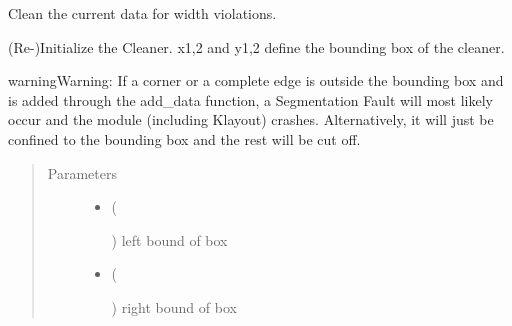 \documentclass[a4paper,10pt,english]{sphinxmanual}
\begin{document}
\begin{fulllineitems}
\begin{fulllineitems}
\label{\detokenize{drc/drc:kppc.drc.kppc.drc.slcleaner.PyDrcSl.clean_width}}
Clean the current data for width violations.

\end{fulllineitems}


\begin{fulllineitems}
\label{\detokenize{drc/drc:kppc.drc.kppc.drc.slcleaner.PyDrcSl.init_list}}
(Re-)Initialize the Cleaner. x1,2 and y1,2 define the bounding box of the cleaner.

\begin{sphinxadmonition}{warning}{Warning:}
If a corner or a complete edge is outside the bounding box and is added through the add\_data function, a Segmentation Fault will most likely occur and the module (including Klayout) crashes. Alternatively, it will just be confined to the bounding box and the rest will be cut off.
\end{sphinxadmonition}
\begin{quote}\begin{description}
\item[{Parameters}] \leavevmode\begin{itemize}
\item {} 
 (%
\begin{footnote}[12]\sphinxAtStartFootnote
{}
%
\end{footnote}) \textendash{} left bound of box

\item {} 
 (%
\begin{footnote}[13]\sphinxAtStartFootnote
{}
%
\end{footnote}) \textendash{} right bound of box


\end{itemize}
\end{description}
\end{quote}
\end{fulllineitems}
\end{fulllineitems}
\end{document}
